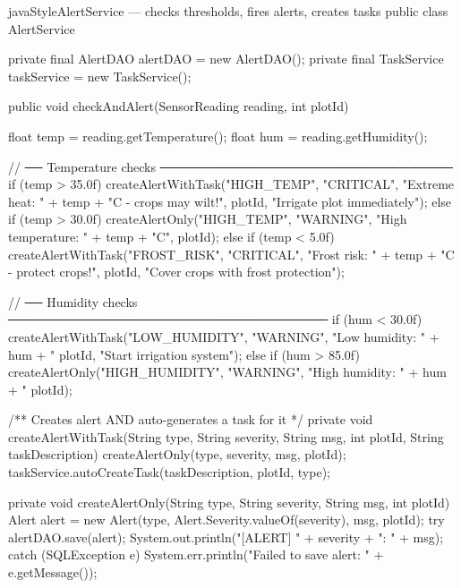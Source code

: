 \documentclass[12pt, a4paper]{report}
\begin{document}
\begin{codeblock}{javaStyle}{AlertService --- checks thresholds, fires alerts, creates tasks}
public class AlertService {
    private final AlertDAO  alertDAO  = new AlertDAO();
    private final TaskService taskService = new TaskService();

    public void checkAndAlert(SensorReading reading, int plotId) {
        float temp = reading.getTemperature();
        float hum  = reading.getHumidity();

        // ── Temperature checks ─────────────────────────────────
        if (temp > 35.0f) {
            createAlertWithTask("HIGH_TEMP", "CRITICAL",
                "Extreme heat: " + temp + "C - crops may wilt!",
                plotId, "Irrigate plot immediately");
        } else if (temp > 30.0f) {
            createAlertOnly("HIGH_TEMP", "WARNING",
                "High temperature: " + temp + "C", plotId);
        } else if (temp < 5.0f) {
            createAlertWithTask("FROST_RISK", "CRITICAL",
                "Frost risk: " + temp + "C - protect crops!",
                plotId, "Cover crops with frost protection");
        }

        // ── Humidity checks ────────────────────────────────────
        if (hum < 30.0f) {
            createAlertWithTask("LOW_HUMIDITY", "WARNING",
                "Low humidity: " + hum + "%
                plotId, "Start irrigation system");
        } else if (hum > 85.0f) {
            createAlertOnly("HIGH_HUMIDITY", "WARNING",
                "High humidity: " + hum + "%
                plotId);
        }
    }

    /** Creates alert AND auto-generates a task for it */
    private void createAlertWithTask(String type, String severity,
            String msg, int plotId, String taskDescription) {
        createAlertOnly(type, severity, msg, plotId);
        taskService.autoCreateTask(taskDescription, plotId, type);
    }

    private void createAlertOnly(String type, String severity,
            String msg, int plotId) {
        Alert alert = new Alert(type,
            Alert.Severity.valueOf(severity), msg, plotId);
        try {
            alertDAO.save(alert);
            System.out.println("[ALERT] " + severity + ": " + msg);
        } catch (SQLException e) {
            System.err.println("Failed to save alert: "
                + e.getMessage());
        }
    }
}
\end{codeblock}
\end{document}
